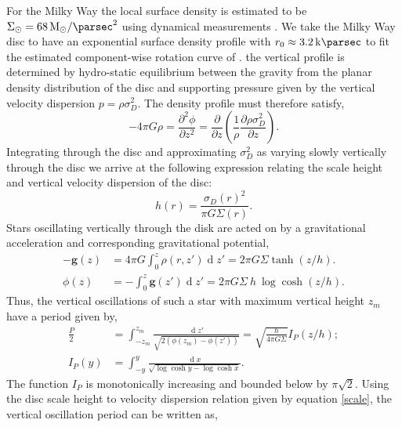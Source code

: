 \documentclass[usenatbib]{mnras}
\renewcommand{\d}[1]{\! \mathrm{d}#1 \:}
\newcommand{\pderiv}[2]{\frac{\partial{#1}}{\partial{#2}}}
\renewcommand{\d}[1]{\ensuremath{\operatorname{d}\!{#1}}}
\begin{document}
For the Milky Way the local surface density is estimated to be $\Sigma_{\odot} = \SI{68}{M_{\odot} \per \parsec \squared}$ using dynamical measurements \citep{dynamical_measurement}. We take the Milky Way disc to have an exponential surface density profile with {\color{red} $r_0 \approx \SI{3.2}{\kilo\parsec}$} to fit the estimated component-wise rotation curve of \cite{milky_way_halo}. {\color{red} the vertical profile is determined by hydro-static equilibrium between the gravity from the planar density distribution of the disc and supporting pressure given by the vertical velocity dispersion $p = \rho \sigma_D^2$. The density profile must therefore satisfy,}
\begin{equation}
- 4 \pi G \rho = \frac{\partial^2 \phi}{\partial z^2} = \pderiv{}{z} \left( \frac{1}{\rho} \pderiv{ \rho \sigma_D^2}{z} \right).
\end{equation}  
Integrating through the disc and approximating $\sigma_D^2$ as varying slowly vertically through the disc we arrive at the following expression relating the scale height and vertical velocity dispersion of the disc:
\begin{equation} \label{scale}
h(r) = \frac{\sigma_D(r)^2}{\pi G \Sigma(r)}.
\end{equation}
Stars oscillating vertically through the disk are acted on by a gravitational acceleration and corresponding gravitational potential,
\begin{subequations}
\begin{align}
-\mathbf{g}(z) & = 4 \pi G \int_0^z \rho(r, z') \d{z'} = 2 \pi G \Sigma \tanh{(z/h)}.
\\
\phi(z) & = - \int_0^z \mathbf{g}(z') \d{z'} = 2 \pi G \Sigma \: h \: \log{\cosh{(z / h)}}.
\end{align}
\end{subequations}
Thus, the vertical oscillations of such a star with maximum vertical height $z_m$ have a period given by,
\begin{subequations}
\begin{align}
\frac{P}{2} & = \int_{-z_m}^{z_m} \frac{\d{z'}}{\sqrt{2(\phi(z_m) - \phi(z'))}} = \sqrt{\frac{h}{4 \pi G \Sigma}} I_P(z / h) ;
\\
I_P(y) &= \int_{-y}^y \frac{\d{x}}{\sqrt{\log{\cosh{y}} - \log{\cosh{x}}}}.
\end{align}
\end{subequations}
The function $I_P$ is monotonically increasing and bounded below by $\pi \sqrt{2}$. 
Using the disc scale height to velocity dispersion relation given by equation \eqref{scale}, the vertical oscillation period can be written as,
\end{document}
